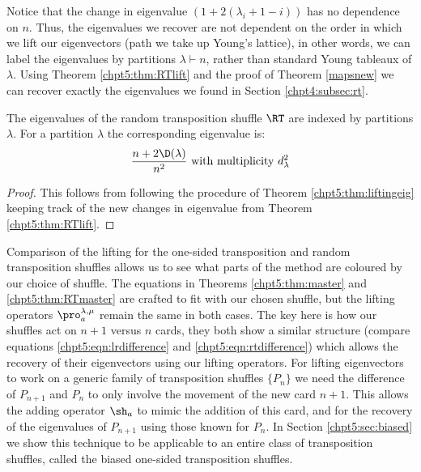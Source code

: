 \documentclass[11pt]{report}
\begin{document}
Notice that the change in eigenvalue $(1+ 2(\lambda_{i}+1-i))$ has no dependence on $n$. Thus, the eigenvalues we recover are not dependent on the order in which we lift our eigenvectors (path we take up Young's lattice), in other words, we can label the eigenvalues  by partitions $\lambda \vdash n$, rather than standard Young tableaux of $\lambda$. Using Theorem \ref{chpt5:thm:RTlift} and the proof of Theorem \ref{mapsnew}  we can recover exactly the eigenvalues we found in Section \ref{chpt4:subsec:rt}.

\begin{lemma}
	\label{chpt5:lem:rteig}
	
	
	The eigenvalues of the random transposition shuffle $\RT$ are indexed by partitions $\lambda$. For a partition $\lambda$ the corresponding eigenvalue is:
	\[  \frac{n + 2\D(\lambda)}{n^{2}} \textnormal{ with multiplicity } d_{\lambda}^{2} \]
\end{lemma}
\begin{proof}
	This follows from following the procedure of Theorem \ref{chpt5:thm:liftingeig} keeping track of the new changes in eigenvalue from Theorem \ref{chpt5:thm:RTlift}.
\end{proof}


Comparison of the lifting for the one-sided transposition and random transposition shuffles allows us to see what parts of the method are coloured by our choice of shuffle. The equations in Theorems \ref{chpt5:thm:master} and \ref{chpt5:thm:RTmaster} are crafted to fit with our chosen shuffle, but the lifting operators $\pro_{a}^{\lambda,\mu}$ remain the same in both cases.
The key here is how our shuffles act on $n+1$ versus $n$ cards, they both show a similar structure (compare equations \eqref{chpt5:eqn:lrdifference} and \eqref{chpt5:eqn:rtdifference}) which allows the recovery of their eigenvectors using our lifting operators.
For lifting eigenvectors to work on a generic family of transposition shuffles $\{P_{n}\}$ we need the difference of $P_{n+1}$ and $P_{n}$ to only involve the movement of the new card $n+1$. This allows the adding operator $\sh_{a}$ to mimic the addition of this card, and for the recovery of the eigenvalues of $P_{n+1}$ using those known for $P_{n}$. In Section \ref{chpt5:sec:biased} we show this technique to be applicable to an entire class of transposition shuffles, called the biased one-sided transposition shuffles.
\end{document}
